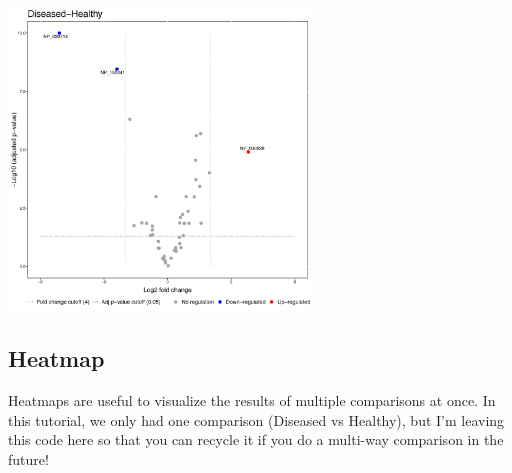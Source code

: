 \documentclass[]{book}
\newenvironment{Shaded}{\begin{snugshade}}{\end{snugshade}}
\newcommand{\DataTypeTok}[1]{\textcolor[rgb]{0.13,0.29,0.53}{#1}}
\newcommand{\DecValTok}[1]{\textcolor[rgb]{0.00,0.00,0.81}{#1}}
\newcommand{\FloatTok}[1]{\textcolor[rgb]{0.00,0.00,0.81}{#1}}
\newcommand{\KeywordTok}[1]{\textcolor[rgb]{0.13,0.29,0.53}{\textbf{#1}}}
\newcommand{\NormalTok}[1]{#1}
\newcommand{\OperatorTok}[1]{\textcolor[rgb]{0.81,0.36,0.00}{\textbf{#1}}}
\newcommand{\StringTok}[1]{\textcolor[rgb]{0.31,0.60,0.02}{#1}}
\begin{document}
\begin{Shaded}
\end{Shaded}

\includegraphics[width=0.6\textwidth,height=\textheight]{img/MSstats_VolcanoPlot.png}

\hypertarget{heatmap}{%
\subsection{Heatmap}\label{heatmap}}

Heatmaps are useful to visualize the results of multiple comparisons at once. In this tutorial, we only had one comparison (Diseased vs Healthy), but I'm leaving this code here so that you can recycle it if you do a multi-way comparison in the future!

\begin{Shaded}
\end{Shaded}
\end{document}
